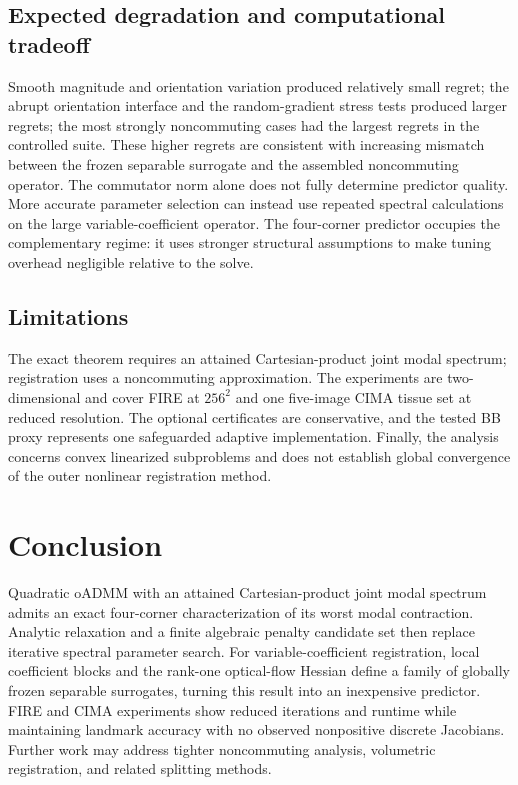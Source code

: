 \documentclass[pdflatex,iicol,sn-mathphys-num]{sn-jnl}
\theoremstyle{definition}
\begin{document}
\subsection{Expected degradation and computational tradeoff}
Smooth magnitude and orientation variation produced relatively small regret;
the abrupt orientation interface and the random-gradient stress tests produced
larger regrets; the most strongly noncommuting cases had the largest regrets
in the controlled suite. These higher regrets are consistent with increasing
mismatch between the frozen separable surrogate and the assembled
noncommuting operator. The commutator norm alone does not fully determine
predictor quality.
More accurate parameter selection
can instead use repeated spectral calculations on the large
variable-coefficient operator. The four-corner predictor occupies the
complementary regime: it uses stronger structural assumptions to make tuning
overhead negligible relative to the solve.

\subsection{Limitations}
The exact theorem requires an attained Cartesian-product joint modal spectrum;
registration uses a noncommuting approximation. The experiments are
two-dimensional and cover FIRE at $256^2$ and one five-image CIMA tissue set at
reduced resolution. The optional certificates are conservative, and the
tested BB proxy represents one safeguarded adaptive implementation. Finally,
the analysis concerns convex linearized subproblems and does not establish
global convergence of the outer nonlinear registration method.

\section{Conclusion}\label{sec:conclusion}
Quadratic oADMM with an attained Cartesian-product joint modal spectrum admits
an exact four-corner characterization of its worst modal contraction. Analytic
relaxation and a finite algebraic penalty candidate set then replace iterative
spectral parameter search. For variable-coefficient registration, local
coefficient blocks and the rank-one optical-flow Hessian define a family of
globally frozen separable surrogates, turning this result into an inexpensive
predictor. FIRE and CIMA experiments show reduced iterations and runtime while
maintaining landmark accuracy with no observed nonpositive discrete Jacobians.
Further work may address tighter noncommuting analysis, volumetric
registration, and related splitting methods.
\end{document}
